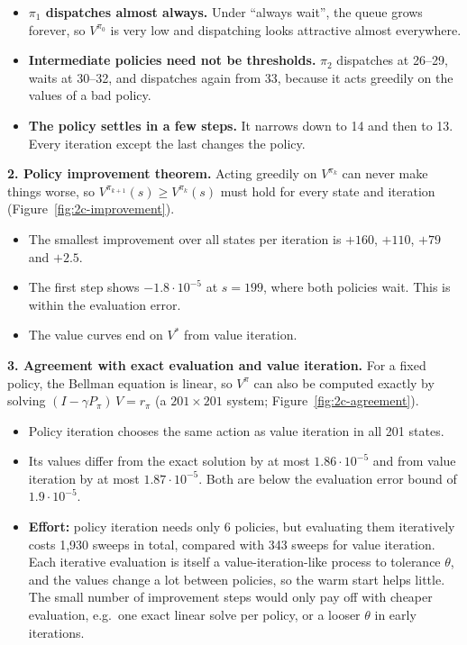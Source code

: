 
\begin{itemize}
  \item \textbf{$\pi_1$ dispatches almost always.} Under ``always wait'', the queue grows forever, so $V^{\pi_0}$ is very low and dispatching looks attractive almost everywhere.
  \item \textbf{Intermediate policies need not be thresholds.} $\pi_2$ dispatches at 26--29, waits at 30--32, and dispatches again from 33, because it acts greedily on the values of a bad policy.
  \item \textbf{The policy settles in a few steps.} It narrows down to 14 and then to 13. Every iteration except the last changes the policy.
\end{itemize}

\textbf{2. Policy improvement theorem.} Acting greedily on $V^{\pi_k}$ can never make things worse, so $V^{\pi_{k+1}}(s) \geq V^{\pi_k}(s)$ must hold for every state and iteration (Figure~\ref{fig:2c-improvement}).
\begin{itemize}
  \item The smallest improvement over all states per iteration is $+160$, $+110$, $+79$ and $+2.5$.
  \item The first step shows $-1.8 \cdot 10^{-5}$ at $s = 199$, where both policies wait. This is within the evaluation error.
  \item The value curves end on $V^*$ from value iteration.
\end{itemize}


\textbf{3. Agreement with exact evaluation and value iteration.} For a fixed policy, the Bellman equation is linear, so $V^\pi$ can also be computed exactly by solving $(I - \gamma P_\pi)\,V = r_\pi$ (a $201 \times 201$ system; Figure~\ref{fig:2c-agreement}).
\begin{itemize}
  \item Policy iteration chooses the same action as value iteration in all 201 states.
  \item Its values differ from the exact solution by at most $1.86 \cdot 10^{-5}$ and from value iteration by at most $1.87 \cdot 10^{-5}$. Both are below the evaluation error bound of $1.9 \cdot 10^{-5}$.
  \item \textbf{Effort:} policy iteration needs only 6 policies, but evaluating them iteratively costs 1,930 sweeps in total, compared with 343 sweeps for value iteration. Each iterative evaluation is itself a value-iteration-like process to tolerance $\theta$, and the values change a lot between policies, so the warm start helps little. The small number of improvement steps would only pay off with cheaper evaluation, e.g.\ one exact linear solve per policy, or a looser $\theta$ in early iterations.
\end{itemize}

